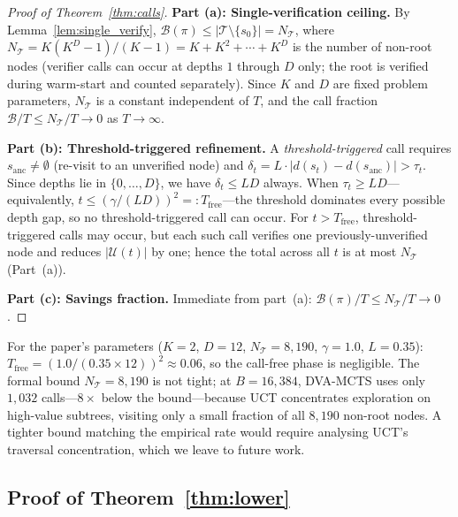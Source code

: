 \begin{proof}[Proof of Theorem~\ref{thm:calls}]

\noindent\textbf{Part (a): Single-verification ceiling.}
By Lemma~\ref{lem:single_verify}, $\mathcal{B}(\pi) \leq |\mathcal{T} \setminus \{s_0\}|
= N_\mathcal{T}$,
where $N_\mathcal{T} = K(K^D-1)/(K-1) = K + K^2 + \cdots + K^D$ is the number of
non-root nodes (verifier calls can occur at depths $1$ through $D$ only; the
root is verified during warm-start and counted separately).  Since $K$ and $D$
are fixed problem parameters, $N_\mathcal{T}$ is a constant independent of $T$, and
the call fraction $\mathcal{B}/T \leq N_\mathcal{T}/T \to 0$ as $T \to \infty$.

\medskip
\noindent\textbf{Part (b): Threshold-triggered refinement.}
A \emph{threshold-triggered} call requires $s_\mathrm{anc} \neq \emptyset$
(re-visit to an unverified node) and $\delta_t = L \cdot |d(s_t) - d(s_\mathrm{anc})| > \tau_t$.
Since depths lie in $\{0,\ldots,D\}$, we have $\delta_t \leq LD$ always.
When $\tau_t \geq LD$---equivalently, $t \leq (\gamma/(LD))^2 =: T_\mathrm{free}$---the
threshold dominates every possible depth gap, so no threshold-triggered call
can occur.  For $t > T_\mathrm{free}$, threshold-triggered calls may occur, but each
such call verifies one previously-unverified node and reduces $|\mathcal{U}(t)|$ by one;
hence the total across all $t$ is at most $N_\mathcal{T}$ (Part~(a)).

\medskip
\noindent\textbf{Part (c): Savings fraction.}
Immediate from part~(a): $\mathcal{B}(\pi)/T \leq N_\mathcal{T}/T \to 0$.

\end{proof}

\begin{remark}
\label{rem:tightness_calls}
For the paper's parameters ($K{=}2$, $D{=}12$, $N_\mathcal{T}{=}8{,}190$,
$\gamma{=}1.0$, $L{=}0.35$): $T_\mathrm{free} = (1.0/(0.35 \times 12))^2 \approx 0.06$,
so the call-free phase is negligible.  The formal bound $N_\mathcal{T} = 8{,}190$ is not
tight; at $B{=}16{,}384$, DVA-MCTS uses only $1{,}032$ calls---$8\times$ below the
bound---because UCT concentrates exploration on high-value subtrees, visiting only
a small fraction of all $8{,}190$ non-root nodes.  A tighter bound matching the
empirical rate would require analysing UCT's traversal concentration, which we
leave to future work.
\end{remark}

\subsection{Proof of Theorem~\ref{thm:lower}}
\label{app:lower}

